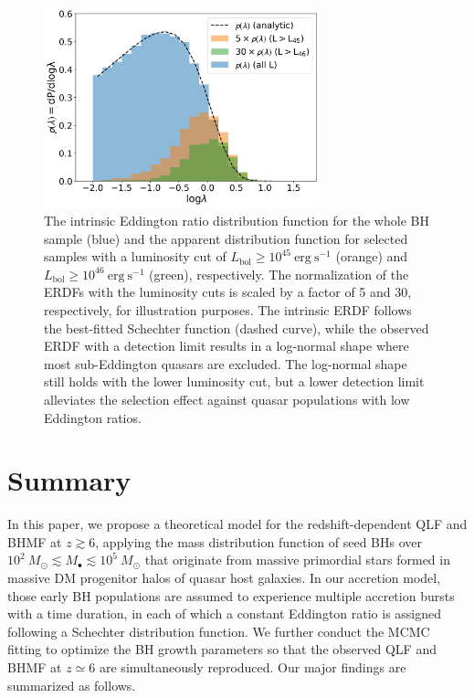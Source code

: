 \documentclass[twocolumn, twocolappendix]{aastex63}
\newcommand{\Msun}{M_\odot}
\newcommand{\Lbol}{L_\mathrm{bol}}
\begin{document}
\begin{CJK*}{UTF8}{gbsn}
\begin{figure}
\centering
\includegraphics[width=80mm]{l_hist.png}
\caption{
The intrinsic Eddington ratio distribution function for the whole BH sample (blue) and the apparent distribution function for selected samples with
a luminosity cut of $\Lbol \geq 10^{45}~\mathrm{erg~s^{-1}}$ (orange) and $\Lbol \geq 10^{46}~\mathrm{erg~s^{-1}}$ (green), respectively.
The normalization of the ERDFs with the luminosity cuts is scaled by a factor of 5 and 30, respectively, for illustration purposes.
The intrinsic ERDF follows the best-fitted Schechter function (dashed curve),
while the observed ERDF with a detection limit results in a log-normal shape where most sub-Eddington quasars are excluded.
The log-normal shape still holds with the lower luminosity cut, but a lower detection limit alleviates the selection effect against quasar populations with low Eddington ratios.
}
\label{fig:lhist}
\end{figure}
  


\section{Summary}
\label{sec:sum}
In this paper, we propose a theoretical model for the redshift-dependent QLF and BHMF at $z\gtrsim 6$,
applying the mass distribution function of seed BHs over $10^2~\Msun \lesssim M_\bullet \lesssim 10^5~\Msun$
that originate from massive primordial stars formed in massive DM progenitor halos of quasar host galaxies.
In our accretion model, those early BH populations are assumed to experience multiple accretion bursts with a time duration,
in each of which a constant Eddington ratio is assigned following a Schechter distribution function.
We further conduct the MCMC fitting to optimize the BH growth parameters
so that the observed QLF and BHMF at $z\simeq 6$ are simultaneously reproduced.
Our major findings are summarized as follows.



\end{CJK*}
\end{document}
